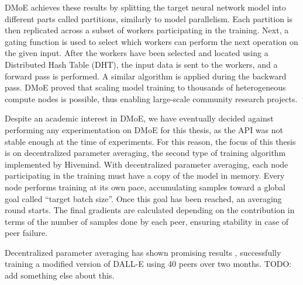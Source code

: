 DMoE achieves these results by splitting the target neural network model into different parts called partitions, similarly to model parallelism.
Each partition is then replicated across a subset of workers participating in the training.
Next, a gating function is used to select which workers can perform the next operation on the given input.
After the workers have been selected and located using a Distributed Hash Table (DHT), the input data is sent to the workers, and a forward pass is performed.
A similar algorithm is applied during the backward pass.
DMoE proved that scaling model training to thousands of heterogeneous compute nodes is possible, thus enabling large-scale community research projects.


Despite an academic interest in DMoE, we have eventually decided against performing any experimentation on DMoE for this thesis, as the API was not stable enough at the time of experiments.
For this reason, the focus of this thesis is on decentralized parameter averaging, the second type of training algorithm implemented by Hivemind.
With decentralized parameter averaging, each node participating in the training must have a copy of the model in memory.
Every node performs training at its own pace, accumulating samples toward a global goal called ``target batch size''.
Once this goal has been reached, an averaging round starts.
The final gradients are calculated depending on the contribution in terms of the number of samples done by each peer, ensuring stability in case of peer failure.

Decentralized parameter averaging has shown promising results \cite{learning30:online}, successfully training a modified version of DALL-E using 40 peers over two months.
TODO: add something else about this.

